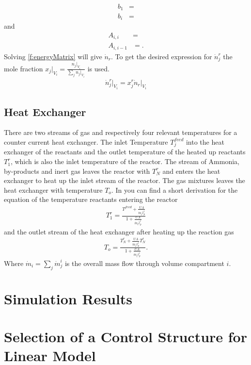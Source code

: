 \documentclass[paper=letter, fontsize=12pt]{article}
\begin{document}
\begin{align}
b_1&= \\
b_i&= 
\end{align}
and
\begin{align}
A_{i,i}&=\\
A_{i,i-1}&=.
\end{align}
Solving \autoref{f:energyMatrix} will give $\dot{n}_r$. To get the desired expression for $\dot{n}^r_j$ the mole fraction $x_j \Big|_{V_i}=\frac{n_j \Big|_{V_i}}{\sum_j n_j \Big|_{V_i}}$ is used.
\begin{align}
\dot{n}^r_j \Big|_{V_i} =x^r_j \dot{n}_r \Big|_{V_i} \label{f:molarOutlet}
\end{align}

\subsection{Heat Exchanger}
There are two streams of gas and respectively four relevant temperatures for a counter current heat exchanger. The inlet Temperature $T^{feed}_j$ into the heat exchanger of the reactants and the outlet temperature of the heated up reactants $T^r_1$, which is also the inlet temperature of the reactor. The stream of Ammonia, by-products and inert gas leaves the reactor with $T^r_N$ and enters the heat exchanger to heat up the inlet stream of the reactor. The gas mixtures leaves the heat exchanger with temperature $T_o$. In \cite{Jinasena2016} you can find a short derivation for the equation of the temperature reactants entering the reactor
\begin{align}
T^r_1=\frac{T^{feed} + \frac{U A}{\dot{m}_i \hat{c}^i_p}}{1 + \frac{U A}{\dot{m}_i \hat{c}^i_p}} \label{f:tempInReact}
\end{align}
and the outlet stream of the heat exchanger after heating up the reaction gas
\begin{align}
T_o=\frac{T^r_N + \frac{U A}{\dot{m}_i \hat{c}^i_p} T^r_N}{1+ \frac{U A}{\dot{m}_i \hat{c}^i_p}}. \label{f:tempOutExchanger}
\end{align}
Where $\dot{m}_i=\sum_j \dot{m}^i_j$ is the overall mass flow through volume compartment $i$.

\section{Simulation Results}





\section{Selection of a Control Structure for Linear Model}
\end{document}
